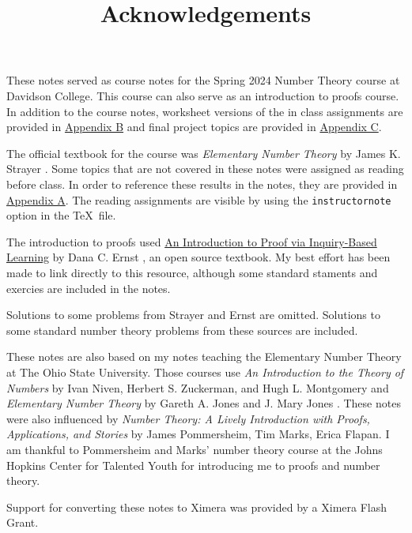 \documentclass[letterpaper, 11 pt]{ximera}
\title{Acknowledgements}
\begin{document}
These notes served as course notes for the Spring 2024 Number Theory course at Davidson College. This course can also serve as an introduction to proofs course. In addition to the course notes, worksheet versions of the in class assignments are provided in \hyperref[inclass]{Appendix B} and final project topics are provided in \hyperref[finalProjects]{Appendix C}.

The official textbook for the course was \emph{Elementary Number Theory} by James K. Strayer \cite{strayer}. Some topics that are not covered in these notes were assigned as reading before class. In order to reference these results in the notes, they are provided in \hyperref[other-results]{Appendix A}. The reading assignments are visible by using the \verb|instructornote| option in the \TeX\ file. 

The introduction to proofs used \href{https://danaernst.com/IBL-IntroToProof/pretext/root--1-2.html}{An Introduction to Proof via Inquiry-Based Learning} by Dana C. Ernst \cite{ernst}, an open source textbook. My best effort has been made to link directly to this resource, although some standard staments and exercies are included in the notes.

Solutions to some problems from Strayer and Ernst are omitted. Solutions to some standard number theory problems from these sources are included.

These notes are also based on my notes teaching the Elementary Number Theory at The Ohio State University. Those courses use \emph{An Introduction to the Theory of Numbers}
by Ivan Niven, Herbert S. Zuckerman, and Hugh L. Montgomery \cite{niven-zuckerman-montgomery} and \emph{Elementary Number Theory} by Gareth A. Jones and J. Mary Jones \cite{jones-jones}. These notes were also influenced by \emph{Number Theory: A Lively Introduction with Proofs, Applications, and Stories} by James Pommersheim, Tim Marks, Erica Flapan. I am thankful to Pommersheim and Marks' number theory course at the Johns Hopkins Center for Talented Youth for introducing me to proofs and number theory.

Support for converting these notes to Ximera was provided by a Ximera Flash Grant.
\end{document}
